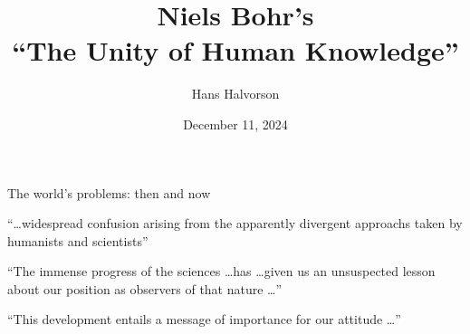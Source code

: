 \documentclass{beamer}
\title{Niels Bohr's \\ ``The Unity of Human Knowledge''}
\author{Hans Halvorson}
\date{December 11, 2024}
\begin{document}
\begin{frame}
    \titlepage
\end{frame}

\begin{frame}{The world's problems: then and now}

  ``\dots widespread confusion arising from the apparently divergent
  approachs taken by humanists and scientists''


\end{frame}
  

\begin{frame}

  ``The immense progress of the sciences \dots has \dots given us an
  unsuspected lesson about our position as observers of that nature
  \dots ''

    

\end{frame}

\begin{frame}

  ``This development entails a message of importance for our attitude
  \dots ''


\end{frame}
\end{document}
